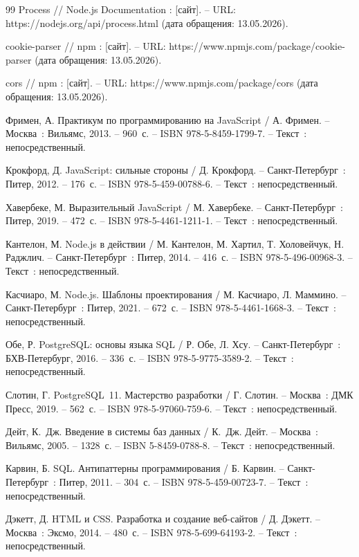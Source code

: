 \begin{thebibliography}{99}
	Process // Node.js Documentation : [сайт]. – URL: https://nodejs.org/api/process.html (дата обращения: 13.05.2026).
	
	cookie-parser // npm : [сайт]. – URL: https://www.npmjs.com/package/cookie-parser (дата обращения: 13.05.2026).
	
	cors // npm : [сайт]. – URL: https://www.npmjs.com/package/cors (дата обращения: 13.05.2026).
	
	Фримен, А. Практикум по программированию на JavaScript / А. Фримен. – Москва~: Вильямс, 2013. – 960~с. – ISBN 978-5-8459-1799-7. – Текст~: непосредственный.
	
	Крокфорд, Д. JavaScript: сильные стороны / Д. Крокфорд. – Санкт-Петербург~: Питер, 2012. – 176~с. – ISBN 978-5-459-00788-6. – Текст~: непосредственный.
	
	Хавербеке, М. Выразительный JavaScript / М. Хавербеке. – Санкт-Петербург~: Питер, 2019. – 472~с. – ISBN 978-5-4461-1211-1. – Текст~: непосредственный.
	
	Кантелон, М. Node.js в действии / М. Кантелон, М. Хартил, Т. Холовейчук, Н. Раджлич. – Санкт-Петербург~: Питер, 2014. – 416~с. – ISBN 978-5-496-00968-3. – Текст~: непосредственный.
	
	Касчиаро, М. Node.js. Шаблоны проектирования / М. Касчиаро, Л. Маммино. – Санкт-Петербург~: Питер, 2021. – 672~с. – ISBN 978-5-4461-1668-3. – Текст~: непосредственный.
	
	Обе, Р. PostgreSQL: основы языка SQL / Р. Обе, Л. Хсу. – Санкт-Петербург~: БХВ-Петербург, 2016. – 336~с. – ISBN 978-5-9775-3589-2. – Текст~: непосредственный.
	
	Слотин, Г. PostgreSQL~11. Мастерство разработки / Г. Слотин. – Москва~: ДМК Пресс, 2019. – 562~с. – ISBN 978-5-97060-759-6. – Текст~: непосредственный.
	
	Дейт, К.~Дж. Введение в системы баз данных / К.~Дж. Дейт. – Москва~: Вильямс, 2005. – 1328~с. – ISBN 5-8459-0788-8. – Текст~: непосредственный.
	
	Карвин, Б. SQL. Антипаттерны программирования / Б. Карвин. – Санкт-Петербург~: Питер, 2011. – 304~с. – ISBN 978-5-459-00723-7. – Текст~: непосредственный.
	
	Дэкетт, Д. HTML и CSS. Разработка и создание веб-сайтов / Д. Дэкетт. – Москва~: Эксмо, 2014. – 480~с. – ISBN 978-5-699-64193-2. – Текст~: непосредственный.
	

\end{thebibliography}
